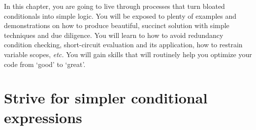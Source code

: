 %
In this chapter, you are going to live through processes that turn bloated conditionals
into simple logic.
You will be exposed to plenty of examples and demonstrations on how to produce beautiful,
succinct solution with simple techniques and due diligence.
You will learn to how to avoid redundancy condition checking,
short-circuit evaluation and its application, how to restrain variable scopes, \textit{etc.}
You will gain skills that will routinely help you optimize your code from `good' to
`great'.




\section{Strive for simpler conditional expressions}\label{sec:logicEquivalences}


